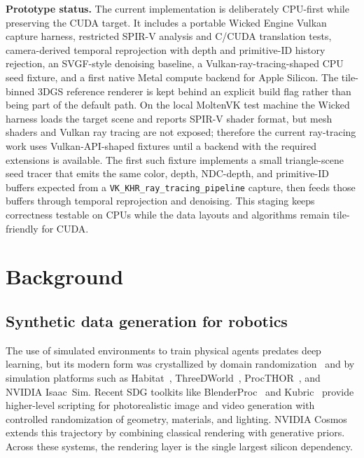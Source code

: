 \documentclass[10pt,journal]{IEEEtran}
\begin{document}
\textbf{Prototype status.} The current implementation is deliberately
CPU-first while preserving the CUDA target. It includes a portable
Wicked Engine Vulkan capture harness, restricted SPIR-V analysis and
C/CUDA translation tests, camera-derived temporal reprojection with
depth and primitive-ID history rejection, an SVGF-style denoising
baseline, a Vulkan-ray-tracing-shaped CPU seed fixture, and a first
native Metal compute backend for Apple Silicon. The
tile-binned 3DGS reference renderer is kept behind an explicit build
flag rather than being part of the default path. On the local MoltenVK
test machine the Wicked harness loads the target scene and reports
SPIR-V shader format, but mesh shaders and Vulkan ray tracing are not
exposed; therefore the current ray-tracing work uses
Vulkan-API-shaped fixtures until a backend with the required extensions
is available. The first such fixture implements a small triangle-scene
seed tracer that emits the same color, depth, NDC-depth, and
primitive-ID buffers expected from a
\texttt{VK\_KHR\_ray\_tracing\_pipeline} capture, then feeds those
buffers through temporal reprojection and denoising. This staging keeps
correctness testable on CPUs while the data layouts and algorithms
remain tile-friendly for CUDA.

\section{Background}\label{sec:bg}

\subsection{Synthetic data generation for robotics}

The use of simulated environments to train physical agents predates deep
learning, but its modern form was crystallized by domain
randomization~\cite{tobin2017domain} and by simulation platforms such as
Habitat~\cite{savva2019habitat}, ThreeDWorld~\cite{gan2020threedworld},
ProcTHOR~\cite{deitke2022procthor}, and NVIDIA Isaac~Sim. Recent SDG
toolkits like BlenderProc~\cite{denninger2019blenderproc} and
Kubric~\cite{greff2022kubric} provide higher-level scripting for
photorealistic image and video generation with controlled randomization
of geometry, materials, and lighting. NVIDIA Cosmos~\cite{nvidia2024cosmos}
extends this trajectory by combining classical rendering with generative
priors. Across these systems, the rendering layer is the single largest
silicon dependency.
\end{document}
